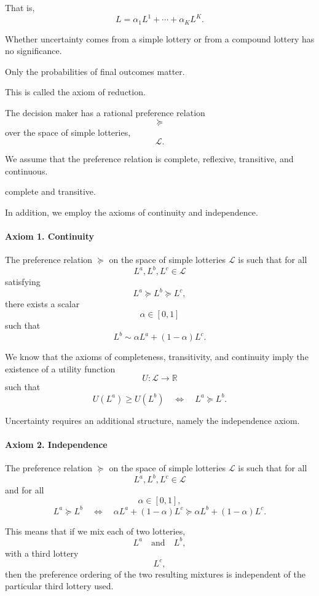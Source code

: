 That is,
\[
L
=
\alpha_1L^1+\cdots+\alpha_KL^K.
\]

Whether uncertainty comes from a simple lottery or from a compound lottery has no significance.

Only the probabilities of final outcomes matter.

This is called the axiom of reduction.

The decision maker has a rational preference relation
\[
\succeq
\]
over the space of simple lotteries,
\[
\mathcal{L}.
\]

We assume that the preference relation is complete, reflexive, transitive, and continuous.





complete and transitive.

In addition, we employ the axioms of continuity and independence.

\paragraph{Axiom 1. Continuity}

The preference relation \(\succeq\) on the space of simple lotteries
\(\mathcal{L}\) is such that for all
\[
L^a,L^b,L^c\in\mathcal{L}
\]
satisfying
\[
L^a\succeq L^b\succeq L^c,
\]
there exists a scalar
\[
\alpha\in[0,1]
\]
such that
\[
L^b
\sim
\alpha L^a+(1-\alpha)L^c.
\]

We know that the axioms of completeness, transitivity, and continuity imply the existence of a utility function
\[
U:\mathcal{L}\to\mathbb{R}
\]
such that
\[
U(L^a)\ge U(L^b)
\quad\Longleftrightarrow\quad
L^a\succeq L^b.
\]

Uncertainty requires an additional structure, namely the independence axiom.

\paragraph{Axiom 2. Independence}

The preference relation \(\succeq\) on the space of simple lotteries
\(\mathcal{L}\) is such that for all
\[
L^a,L^b,L^c\in\mathcal{L}
\]
and for all
\[
\alpha\in[0,1],
\]
\[
L^a\succeq L^b
\quad\Longleftrightarrow\quad
\alpha L^a+(1-\alpha)L^c
\succeq
\alpha L^b+(1-\alpha)L^c.
\]

This means that if we mix each of two lotteries,
\[
L^a
\quad\text{and}\quad
L^b,
\]
with a third lottery
\[
L^c,
\]
then the preference ordering of the two resulting mixtures is independent of the particular third lottery used.

